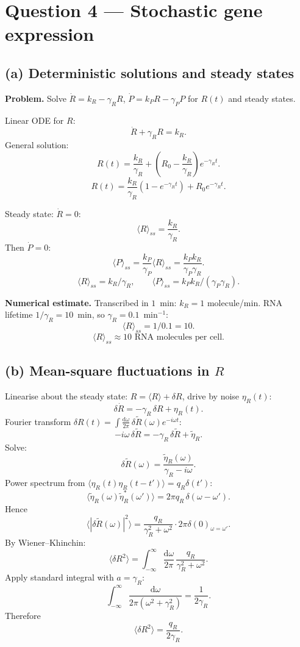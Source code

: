 \documentclass[11pt]{article}
\newcommand{\de}{\mathrm{d}}
\begin{document}
\section*{Question 4 --- Stochastic gene expression}

\subsection*{(a) Deterministic solutions and steady states}

\textbf{Problem.} Solve $\dot R = k_R - \gamma_R R$, $\dot P = k_P R - \gamma_P P$ for $R(t)$ and steady states.

Linear ODE for $R$:
\[ \dot R + \gamma_R R = k_R. \]
General solution:
\[ R(t) = \frac{k_R}{\gamma_R} + \!\left(R_0 - \frac{k_R}{\gamma_R}\right)\!e^{-\gamma_R t}. \]
\[ \boxed{\;R(t) = \frac{k_R}{\gamma_R}\!\left(1-e^{-\gamma_R t}\right) + R_0 e^{-\gamma_R t}.\;} \]

Steady state: $\dot R = 0$:
\[ \langle R\rangle_{ss} = \frac{k_R}{\gamma_R}. \]
Then $\dot P = 0$:
\[ \langle P\rangle_{ss} = \frac{k_P}{\gamma_P}\langle R\rangle_{ss} = \frac{k_P k_R}{\gamma_P\gamma_R}. \]
\[ \boxed{\;\langle R\rangle_{ss} = k_R/\gamma_R,\qquad \langle P\rangle_{ss} = k_P k_R/(\gamma_P\gamma_R).\;} \]

\textbf{Numerical estimate.} Transcribed in $1$~min: $k_R = 1$ molecule/min. RNA lifetime $1/\gamma_R = 10$~min, so $\gamma_R = 0.1$~min$^{-1}$:
\[ \langle R\rangle_{ss} = 1/0.1 = 10. \]
\[ \boxed{\;\langle R\rangle_{ss} \approx 10\text{ RNA molecules per cell.}\;} \]

\subsection*{(b) Mean-square fluctuations in $R$}

Linearise about the steady state: $R = \langle R\rangle + \delta R$, drive by noise $\eta_R(t)$:
\[ \delta\dot R = -\gamma_R\,\delta R + \eta_R(t). \]
Fourier transform $\delta R(t) = \int\!\frac{\de\omega}{2\pi}\,\delta\tilde R(\omega) e^{-i\omega t}$:
\[ -i\omega\,\delta\tilde R = -\gamma_R\,\delta\tilde R + \tilde\eta_R. \]
Solve:
\[ \delta\tilde R(\omega) = \frac{\tilde\eta_R(\omega)}{\gamma_R - i\omega}. \]
Power spectrum from $\langle\eta_R(t)\eta_R(t-t')\rangle = q_R\delta(t')$:
\[ \langle\tilde\eta_R(\omega)\tilde\eta_R^*(\omega')\rangle = 2\pi q_R\,\delta(\omega-\omega'). \]
Hence
\[ \langle|\delta\tilde R(\omega)|^2\rangle = \frac{q_R}{\gamma_R^2 + \omega^2}\cdot 2\pi\delta(0)_{\omega=\omega'}. \]
By Wiener--Khinchin:
\[ \langle\delta R^2\rangle = \int_{-\infty}^{\infty}\!\frac{\de\omega}{2\pi}\,\frac{q_R}{\gamma_R^2+\omega^2}. \]
Apply standard integral with $a=\gamma_R$:
\[ \int_{-\infty}^{\infty}\!\frac{\de\omega}{2\pi(\omega^2+\gamma_R^2)} = \frac{1}{2\gamma_R}. \]
Therefore
\[ \boxed{\;\langle\delta R^2\rangle = \frac{q_R}{2\gamma_R}.\;} \]
\end{document}
